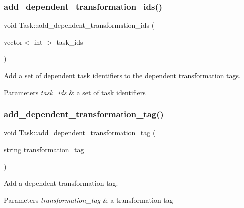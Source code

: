 \subsubsection{\texorpdfstring{add\+\_\+dependent\+\_\+transformation\+\_\+ids()}{add\_dependent\_transformation\_ids()}}
{\footnotesize\ttfamily void Task\+::add\+\_\+dependent\+\_\+transformation\+\_\+ids (\begin{DoxyParamCaption}\item[{vector$<$ int $>$}]{task\+\_\+ids }\end{DoxyParamCaption})\hspace{0.3cm}{\ttfamily [protected]}}

Add a set of dependent task identifiers to the dependent transformation tags. 
\begin{DoxyParams}{Parameters}
{\em task\+\_\+ids} & a set of task identifiers \\
\hline
\end{DoxyParams}
\mbox{\label{classTask_a404469dca46fda1c94e819345bd478e3}} 
\subsubsection{\texorpdfstring{add\+\_\+dependent\+\_\+transformation\+\_\+tag()}{add\_dependent\_transformation\_tag()}}
{\footnotesize\ttfamily void Task\+::add\+\_\+dependent\+\_\+transformation\+\_\+tag (\begin{DoxyParamCaption}\item[{string}]{transformation\+\_\+tag }\end{DoxyParamCaption})\hspace{0.3cm}{\ttfamily [protected]}}

Add a dependent transformation tag. 
\begin{DoxyParams}{Parameters}
{\em transformation\+\_\+tag} & a transformation tag \\
\hline
\end{DoxyParams}
\mbox{\label{classTask_a861c0dc321a4b0e77f7cbe89dc7da75c}} 
